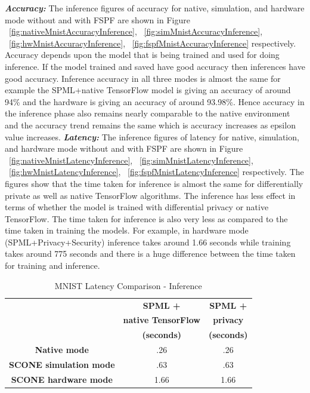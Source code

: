 \newline
\newline
\textbf{\textit{Accuracy: }}The inference figures of accuracy for native, simulation, and hardware mode without and with FSPF are shown in Figure ~\ref{fig:nativeMnistAccuracyInference}, ~\ref{fig:simMnistAccuracyInference}, ~\ref{fig:hwMnistAccuracyInference}, ~\ref{fig:fspfMnistAccuracyInference}  respectively. Accuracy depends upon the model that is being trained and used for doing inference. If the model trained and saved have good accuracy then inferences have good accuracy. Inference accuracy in all three modes is almost the same for example the SPML+native TensorFlow model is giving an accuracy of around 94\% and the hardware is giving an accuracy of around 93.98\%. Hence accuracy in the inference phase also remains nearly comparable to the native environment and the accuracy trend remains the same which is accuracy increases as epsilon value increases.
\newline
\newline
\textbf{\textit{Latency: }}The inference figures of latency for native, simulation, and hardware mode without and with FSPF are shown in Figure ~\ref{fig:nativeMnistLatencyInference}, ~\ref{fig:simMnistLatencyInference}, ~\ref{fig:hwMnistLatencyInference}, ~\ref{fig:fspfMnistLatencyInference} respectively. The figures show that the time taken for inference is almost the same for differentially private as well as native TensorFlow algorithms. The inference has less effect in terms of whether the model is trained with differential privacy or native TensorFlow. The time taken for inference is also very less as compared to the time taken in training the models. For example, in hardware mode (SPML+Privacy+Security) inference takes around 1.66 seconds while training takes around 775 seconds and there is a huge difference between the time taken for training and inference. \newline
\begin{table}[h!]
  \begin{center}
    \caption{MNIST Latency Comparison - Inference }
    \label{tab:mnistLatencyInference}
    \begin{tabular}{|c|c|c|}
      \hline
      \textbf{} & \textbf{SPML +} & \textbf{SPML +} \\
      \textbf{} & \textbf{native TensorFlow} & \textbf{privacy} \\
      \textbf{} & \textbf{(seconds)} & \textbf{(seconds)} \\
      \hline
      \textbf{Native mode} & .26        &   .26\\
      \hline
      \textbf{SCONE simulation mode} &  .63       &     .63\\
      \hline    
      \textbf{SCONE hardware mode} &    1.66     &      1.66\\
      \hline
    \end{tabular}
   \end{center}
\end{table}
